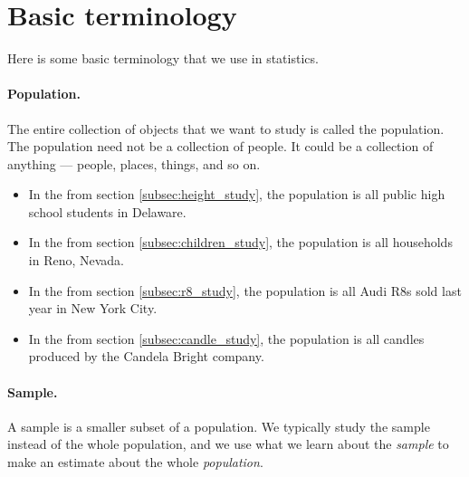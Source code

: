 \documentclass[../../../main.tex]{subfiles}
\begin{document}
\section{Basic terminology}

Here is some basic terminology that we use in statistics.


\paragraph{Population.}

The entire collection of objects that we want to study is called the population. The population need not be a collection of people. It could be a collection of anything --- people, places, things, and so on.

\begin{itemize}

  \item In the  from section \ref{subsec:height_study}, the population is all public high school students in Delaware.
    
  \item In the  from section \ref{subsec:children_study}, the population is all households in Reno, Nevada.
    
  \item In the  from section \ref{subsec:r8_study}, the population is all Audi R8s sold last year in New York City.
  
  \item In the  from section \ref{subsec:candle_study}, the population is all candles produced by the Candela Bright company.

\end{itemize}


\paragraph{Sample.}

A sample is a smaller subset of a population. We typically study the sample instead of the whole population, and we use what we learn about the \emph{sample} to make an estimate about the whole \emph{population}.
\end{document}

